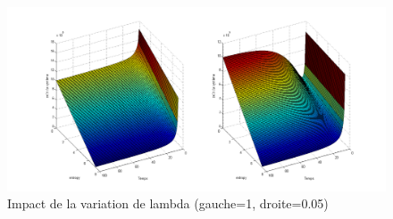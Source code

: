 \begin{figure}[ht]
\centering
     \includegraphics[width=1.0\linewidth]{Paul/Matlab/lambda_var.png}
     \caption{Impact de la variation de lambda (gauche=1, droite=0.05)}
     \label{normal_case}
\end{figure}

